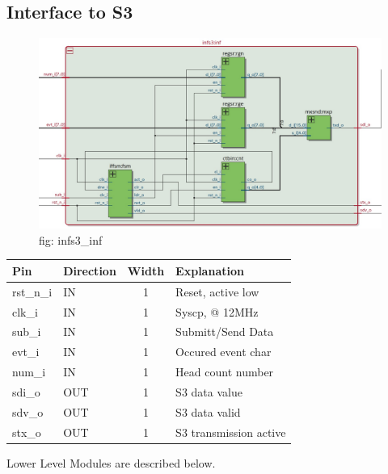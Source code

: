 \documentclass[12pt,a4 paper] {report}
\begin{document}
\subsection{Interface to S3}
\begin{figure}[h]
	\centering	
	\includegraphics[scale=0.3]{../png/infs3_inf.png}
	\newline
	fig: infs3\_inf\\
\end{figure}
\begin{center}
	\begin{tabular}{| p{2cm} | p{2cm} | c| p{4cm} |}
		\hline
		Pin & Direction & Width & Explanation\\
		\hline	
  		rst\_n\_i & IN & 1 & Reset, active low\\
  		\hline
		clk\_i   & IN  & 1 &  Syscp, @ 12MHz \\
		\hline
		sub\_i   & IN & 1 &   Submitt/Send Data \\
		\hline
		evt\_i   & IN  & 1 &  Occured event char \\
		\hline
		num\_i  &  IN & 1 & Head count number\\
		\hline
		sdi\_o   & OUT &1 & S3 data value\\
		\hline
		sdv\_o    & OUT&1 & S3 data valid\\
		\hline
		stx\_o   & OUT& 1& S3 transmission active\\
		\hline
	
		\end{tabular}
\end{center}
\newpage
Lower Level Modules are described below.\\
\end{document}
